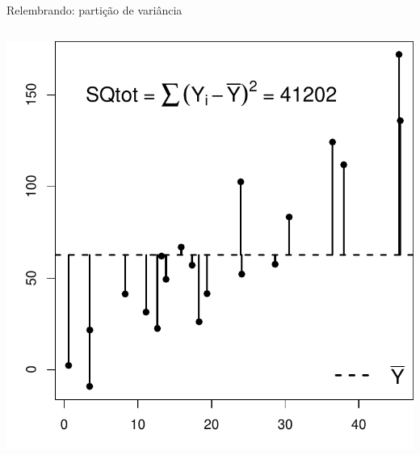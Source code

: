 \documentclass{beamer}\usepackage[]{graphicx}\usepackage[]{color}
\newenvironment{knitrout}{}{} %
\renewenvironment{knitrout}{\setlength{\topsep}{0mm}}{}
\begin{document}
\begin{frame}{Relembrando: partição de variância}



\begin{columns}[c]


\begin{knitrout}
\color{fgcolor}
\includegraphics[width=1.1\linewidth]{figure/plotsqt-1} 

\end{knitrout}

\pause



\end{columns}
\end{frame}
\end{document}

